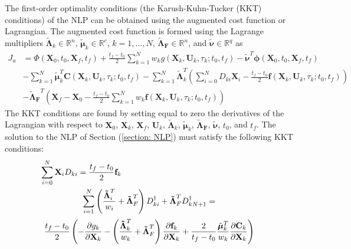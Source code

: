 \documentclass[10pt,final]{report}
\begin{document}
The first-order optimality conditions (\ie the Karush-Kuhn-Tucker
(KKT) conditions) of the NLP can be obtained using the augmented cost
function or Lagrangian. The augmented cost function
is formed using the Lagrange multipliers $\boldsymbol{\tilde \Lambda}_k
\in\mathbb{R}^n$, $\boldsymbol{\tilde \mu}_k \in\mathbb{R}^c$, $k =
1,\ldots,N$, $\boldsymbol{\tilde \Lambda_F}\in\mathbb{R}^n$, and
$\boldsymbol{\tilde \nu} \in\mathbb{R}^q$ as
\begin{equation}
  \begin{split}
    J_a & = \Phi(\textbf{X}_0,t_0,\textbf{X}_f,t_f)
    + \displaystyle\frac{t_f-t_0}{2}\sum_{k=1}^N w_k
    g(\textbf{X}_k,\textbf{U}_k,\tau_k;t_0,t_f)
    - \boldsymbol{\tilde \nu}^T
    \boldsymbol{\phi}(\textbf{X}_0,t_0,\textbf{X}_f,t_f) \\
    & -  \displaystyle\sum_{k = 1}^N \boldsymbol{\tilde\mu}_{k}^T
    \textbf{C}(\textbf{X}_k,\textbf{U}_k,\tau_k;t_0,t_f)
    - \displaystyle\sum_{k=1}^N \boldsymbol{\tilde \Lambda}_k^T
    \left(  \sum_{i=0}^N D_{ki}  \textbf{X}_i
      - \displaystyle\frac{t_f-t_0}{2}
    \textbf{f}(\textbf{X}_k,\textbf{U}_k,\tau_k;t_0,t_f) \right) \\
    & - \boldsymbol{\tilde \Lambda_F}^T \left(  \textbf{X}_f -
      \textbf{X}_0 - \displaystyle\frac{t_f-t_0}{2}\sum_{k=1}^N w_k
      \textbf{f}(\textbf{X}_k,\textbf{U}_k,\tau_k;t_0,t_f) \right)
    \end{split}
\end{equation}
The KKT conditions are found by setting equal to zero the derivatives
of the Lagrangian with respect to $\textbf{X}_0$, $\textbf{X}_k$,
$\textbf{X}_f$, $\textbf{U}_k$, $\boldsymbol{\tilde \Lambda}_k$,
$\boldsymbol{\tilde \mu}_k$, $\boldsymbol{\tilde \Lambda_F}$,
$\boldsymbol{\tilde \nu}$, $t_0$, and $t_f$. The solution to the NLP
of Section (\ref{section: NLP}) must satisfy the following KKT conditions:
\begin{eqnarray} \label{kkt 1}
  &  \displaystyle\sum_{i=0}^N
  \textbf{X}_i D_{ki} = \frac{t_f-t_0}{2}
  \textbf{f}_k & \vspace{6pt}\\ \label{kkt 2}
  & \begin{array}{c} \displaystyle\sum_{i=1}^N
    \left(\frac{\boldsymbol{\tilde\Lambda}_i^T}{w_i} +
      \boldsymbol{\tilde \Lambda}^T_F \right)  D^{\dag}_{ki} +
    \boldsymbol{\tilde \Lambda}^T_F  D^{\dag}_{kN+1} = \vspace{6pt}\\
    \label{kkt 3}
    \displaystyle\frac{t_f-t_0}{2} \left(
      -\frac{\partial g_k}{\partial \textbf{X}_k}
      - \left(\frac{\boldsymbol{\tilde\Lambda}_k^T}{w_k} +
        \boldsymbol{\tilde \Lambda}^T_F \right)  \frac{\partial
        \textbf{f}_k}{\partial \textbf{X}_k} +
      \frac{2}{t_f-t_0}\frac{\tilde{\boldsymbol{\mu}}_{k}^T}{w_k}
      \frac{\partial \textbf{C}_{k}}{\partial \textbf{X}_k} \right)
  \end{array} & \vspace{6pt}
\end{eqnarray}
\end{document}
